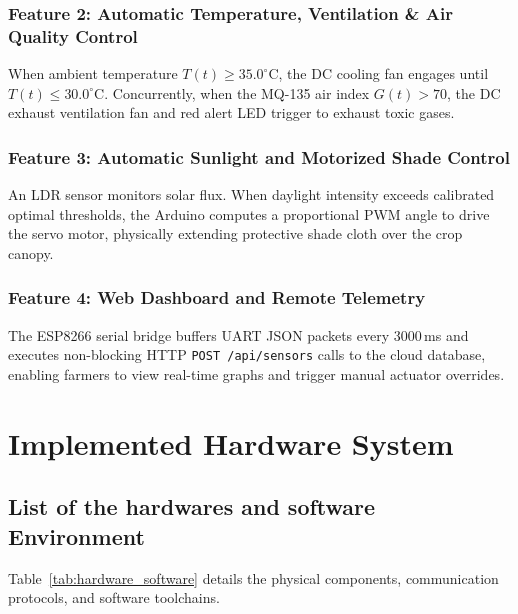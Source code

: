 \documentclass[conference]{IEEEtran}
\begin{document}
\subsubsection{Feature 2: Automatic Temperature, Ventilation \& Air Quality Control}
When ambient temperature $T(t) \ge 35.0^\circ\text{C}$, the DC cooling fan engages until $T(t) \le 30.0^\circ\text{C}$. Concurrently, when the MQ-135 air index $G(t) > 70$, the DC exhaust ventilation fan and red alert LED trigger to exhaust toxic gases.

\subsubsection{Feature 3: Automatic Sunlight and Motorized Shade Control}
An LDR sensor monitors solar flux. When daylight intensity exceeds calibrated optimal thresholds, the Arduino computes a proportional PWM angle to drive the servo motor, physically extending protective shade cloth over the crop canopy.

\subsubsection{Feature 4: Web Dashboard and Remote Telemetry}
The ESP8266 serial bridge buffers UART JSON packets every 3000\,ms and executes non-blocking HTTP \texttt{POST /api/sensors} calls to the cloud database, enabling farmers to view real-time graphs and trigger manual actuator overrides.

\section{Implemented Hardware System}

\subsection{List of the hardwares and software Environment}
Table~\ref{tab:hardware_software} details the physical components, communication protocols, and software toolchains.
\end{document}

